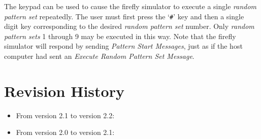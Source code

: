 \documentclass[letterpaper,11pt]{article}
\begin{document}
The keypad can be used to cause the firefly simulator to execute a single
\textit{random pattern set} repeatedly. The user must first press the
`\texttt{\#}' key and then a single digit key corresponding to the desired
\textit{random pattern set} number. Only \textit{random pattern sets} 1
through 9 may be executed in this way. Note that the firefly simulator will
respond by sending \textit{Pattern Start Messages}, just as if the host
computer had sent an \textit{Execute Random Pattern Set Message}.

\section{Revision History}

\begin{itemize}
\item From version 2.1 to version 2.2:

\item From version 2.0 to version 2.1:


\end{itemize}
\end{document}
